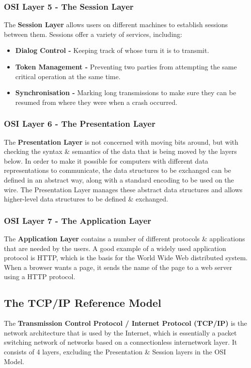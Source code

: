 \documentclass[11pt]{article}
\begin{document}
\subsubsection{OSI Layer 5 - The Session Layer}
The \textbf{Session Layer} allows users on different machines to establish sessions between them. 
Sessions offer a variety of services, including: 
\begin{itemize} 
    \item   \textbf{Dialog Control -} Keeping track of whose turn it is to transmit. 
    \item   \textbf{Token Management -} Preventing two parties from attempting the same critical operation at the same time. 
    \item   \textbf{Synchronisation -} Marking long transmissions to make sure they can be resumed from where they were when a 
            crash occurred. 
\end{itemize}

\subsubsection{OSI Layer 6 - The Presentation Layer}
The \textbf{Presentation Layer} is not concerned with moving bits around, but with checking the syntax \& semantics of the data 
that is being moved by the layers below. 
In order to make it possible for computers with different data representations to communicate, the data structures to be 
exchanged can be defined in an abstract way, along with a standard encoding to be used on the wire. 
The Presentation Layer manages these abstract data structures and allows higher-level data structures to be defined \& exchanged. 

\subsubsection{OSI Layer 7 - The Application Layer} 
The \textbf{Application Layer} contains a number of different protocols \& applications that are needed by the users. 
A good example of a widely used application protocol is HTTP, which is the basis for the World Wide Web distributed system. 
When a browser wants a page, it sends the name of the page to a web server using a HTTP protocol. 

\subsection{The TCP/IP Reference Model}
The \textbf{Transmission Control Protocol / Internet Protocol (TCP/IP)} is the network architecture that is used by the Internet, 
which is essentially a packet switching network of networks based on a connectionless internetwork layer. 
It consists of 4 layers, excluding the Presentation \& Session layers in the OSI Model. 
\end{document}

